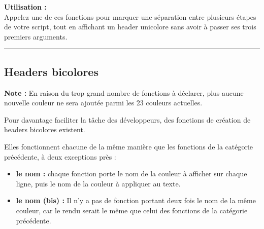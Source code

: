 \documentclass[a4paper,10pt]{article}
\begin{document}
\begin{justify}
    \textbf{Utilisation :}\\
    Appelez une de ces fonctions pour marquer une séparation entre plusieurs étapes de votre script, tout en affichant un header unicolore sans avoir à passer ses trois premiers arguments.
\end{justify}




\color{green}\par\noindent\rule{\textwidth}{0.4pt}\color{white}

\color{green}
\subsection{Headers bicolores}\color{white}

\begin{justify}
    \textbf{Note :} En raison du trop grand nombre de fonctions à déclarer, plus aucune nouvelle couleur ne sera ajoutée parmi les 23 couleurs actuelles.
\end{justify}


\begin{justify}
    Pour davantage faciliter la tâche des développeurs, des fonctions de création de headers bicolores existent.
\end{justify}

\begin{justify}
    Elles fonctionnent chacune de la même manière que les fonctions de la catégorie précédente, à deux exceptions près :

    \begin{itemize}
        \item \textbf{le nom :} chaque fonction porte le nom de la couleur à afficher sur chaque ligne, puis le nom de la couleur à appliquer au texte.\\

        \item \textbf{le nom (bis) :} Il n'y a pas de fonction portant deux fois le nom de la même couleur, car le rendu serait le même que celui des fonctions de la catégorie précédente.
    \end{itemize}
\end{justify}



\end{document}
